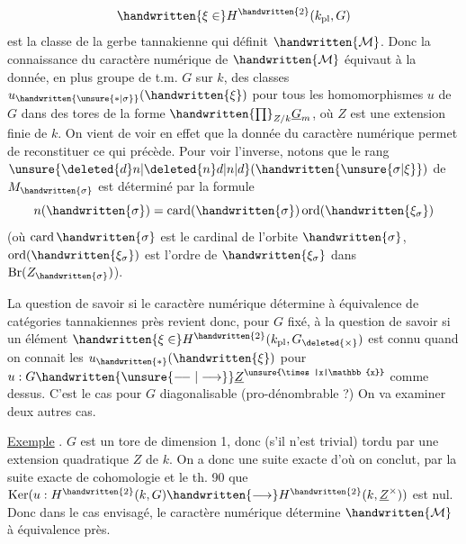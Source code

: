 \[
\handwritten{\xi\in}H^{\handwritten{2}}(k_{\mathrm{pl}},G)
\]
est la classe de la gerbe tannakienne qui définit $\handwritten{\mathcal{M}}$. Donc la connaissance du caractère numérique de $\handwritten{\mathcal{M}}$ équivaut à la donnée, en plus  groupe de t.m. $G$ sur $k$, des classes $u_{\handwritten{\unsure{*|\sigma}}}(\handwritten{\xi})$ pour tous les homomorphismes $u$ de $G$ dans des tores de la forme $\handwritten{\prod}_{Z/k}\underline{G}_m$, où $Z$ est une extension finie de $k$. \deleted{(}On vient de voir en effet que la donnée du caractère numérique permet de reconstituer ce qui précède. Pour voir l'inverse, notons que  le rang $\unsure{\deleted{d}n|\deleted{n}d|n|d}(\handwritten{\unsure{\sigma|\xi}})$ de $M_{\handwritten{\sigma}}$ est déterminé par la formule
\[
n(\handwritten{\sigma})=\operatorname{card}(\handwritten{\sigma})\operatorname{ord}(\handwritten{\xi_\sigma})
\]
(où $\operatorname{card}\handwritten{\sigma}$ est le cardinal de l'orbite $\handwritten{\sigma}$, $\operatorname{ord}(\handwritten{\xi_\sigma})$ est l'ordre de $\handwritten{\xi_\sigma}$ dans $\operatorname{Br}(Z_{\handwritten{\sigma}})$).

La question de savoir si le caractère numérique détermine à équivalence de catégories tannakiennes près revient donc, pour $G$ fixé, à la question de savoir si un élément  $\handwritten{\xi\in}H^{\handwritten{2}}(k_{\mathrm{pl}},G_{\deleted{\times}})$ est connu quand on connait les $u_{\handwritten{*}}(\handwritten{\xi})$ pour $u:G\handwritten{\unsure{\mathrel{-\! -}|\longrightarrow}}\underline{Z}^{\unsure{\times|x|\mathbb{x}}}$ comme dessus.  C'est le cas pour $G$ diagonalisable  (pro-dénombrable ?) On va examiner deux autres cas.

\uline{Exemple} . $G$ est un tore de dimension 1, donc (s'il n'est trivial) tordu par une extension quadratique $Z$ de $k$. On a donc une suite exacte
d'où on conclut, par la suite exacte de cohomologie et le th. 90 que $\operatorname{Ker}(u:H^{\handwritten{2}}(k,G)\handwritten{\longrightarrow}H^{\handwritten{2}}(k,\underline{Z}^{\times}))$ est nul. Donc dans le cas envisagé, le caractère numérique détermine $\handwritten{\mathcal{M}}$ à équivalence près.

